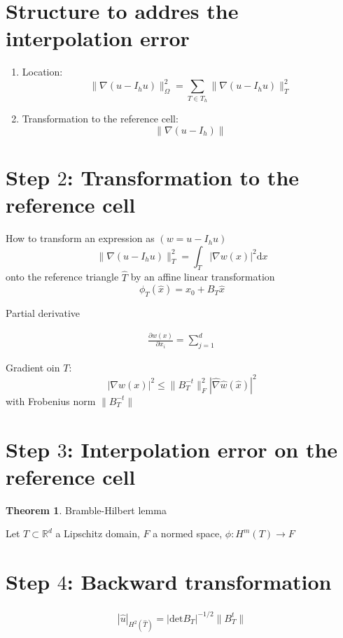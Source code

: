 \documentclass[openany,a4paper,11pt]{memoir}
\theoremstyle{definition}
\newtheorem{theorem}{Theorem}
\begin{document}
\section{Structure to addres the interpolation error}

\begin{enumerate}
\item Location: \[ \|\nabla(u-I_h u) \|^2_{\Omega}=\sum_{T\in T_h}\|\nabla(u-I_h u)\|^2_{T} \]
  
\item Transformation to the reference cell: \[\|\nabla(u-I_h)\| \]
\end{enumerate}

\section{Step $2$: Transformation to the reference cell}

How to transform an expression as $(w=u-I_h u)$ \[\|\nabla(u-I_h u)\|^2_{T}=\int_{T}|\nabla w(x)|^2\mathrm{d}x \] onto the reference triangle $\hat{T}$ by an affine linear transformation \[\phi_T(\hat{x})=x_0+B_T\hat{x} \]

Partial derivative

\begin{align*}
  \frac{\partial w(x)}{\partial x_i}=\sum_{j=1}^{d}
\end{align*}

Gradient oin $T$: \[ |\nabla w(x)|^2\le \|B_T^{-t}\|^2_{F}|\hat{\nabla}\hat{w}(\hat{x})|^2 \] with Frobenius norm $\|B_T^{-t}\|$

\section{Step $3$: Interpolation error on the reference cell}

\begin{theorem}
  Bramble-Hilbert lemma

  Let $T\subset\mathbb{R}^d$ a Lipschitz domain, $F$ a normed space, $\phi: H^m(T)\rightarrow F$
\end{theorem}

\section{Step $4$: Backward transformation}

\begin{align*}
  |\hat{u}|_{H^2(\hat{T})}=|\mathrm{det} B_T|^{-1/2}\|B_T^t\|
\end{align*}
\end{document}
